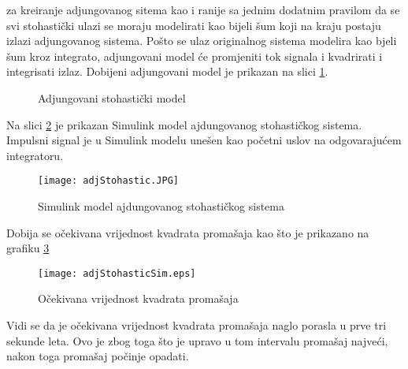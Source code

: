 za kreiranje adjungovanog sitema kao i ranije sa jednim dodatnim pravilom da se 
svi stohastički ulazi se moraju modelirati kao bijeli šum koji na kraju postaju 
izlazi adjungovanog sistema. Pošto se ulaz originalnog sistema modelira kao bjeli šum 
kroz integrato, adjungovani model će promjeniti tok signala i kvadrirati i integrisati izlaz.
Dobijeni adjungovani model je prikazan na slici \ref{fig:adjStohastic}.
\begin{figure}[!ht]
    \centering

    \caption{Adjungovani stohastički model}
    \label{fig:adjStohastic}
\end{figure}
Na slici \ref{fig:adjStohasticSimm} je prikazan Simulink model ajdungovanog stohastičkog sistema. 
Impulsni signal je u Simulink modelu unešen kao početni uslov na odgovarajućem integratoru. 
\begin{figure}[!ht]
    \centering
    \texttt{[image: adjStohastic.JPG]}
    \caption{Simulink model ajdungovanog stohastičkog sistema}
    \label{fig:adjStohasticSimm}
\end{figure}
Dobija se očekivana vrijednost kvadrata promašaja kao što je prikazano na grafiku \ref{fig:stohGraf}
\begin{figure}[!ht]
    \centering
    \texttt{[image: adjStohasticSim.eps]}
    \caption{Očekivana vrijednost kvadrata promašaja}
    \label{fig:stohGraf}
\end{figure}
Vidi se da je očekivana vrijednost kvadrata promašaja naglo porasla u prve tri sekunde leta. 
Ovo je zbog toga što je upravo u tom intervalu promašaj najveći, nakon toga promašaj počinje opadati.



